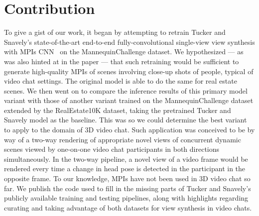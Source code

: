 \section{Contribution}\label{sec:contribution} 

To give a gist of our work, it began by attempting to retrain Tucker and Snavely's state-of-the-art end-to-end fully-convolutional single-view view synthesis with MPIs CNN~\cite{single_view_mpi} on the MannequinChallenge dataset. We hypothesized --- as was also hinted at in the paper --- that such retraining would be sufficient to generate high-quality MPIs of scenes involving close-up shots of people, typical of video chat settings. The original model is able to do the same for real estate scenes. We then went on to compare the inference results of this primary model variant with those of another variant trained on the MannequinChallenge dataset extended by the RealEstate10K dataset, taking the pretrained Tucker and Snavely model as the baseline. This was so we could determine the best variant to apply to the domain of 3D video chat. Such application was conceived to be by way of a two-way rendering of appropriate novel views of concurrent dynamic scenes viewed by one-on-one video chat participants in both directions simultaneously. In the two-way pipeline, a novel view of a video frame would be rendered every time a change in head pose is detected in the participant in the opposite frame. To our knowledge, MPIs have not been used in 3D video chat so far. We publish the code used to fill in the missing parts of Tucker and Snavely's publicly available training and testing pipelines, along with highlights regarding curating and taking advantage of both datasets for view synthesis in video chats.
